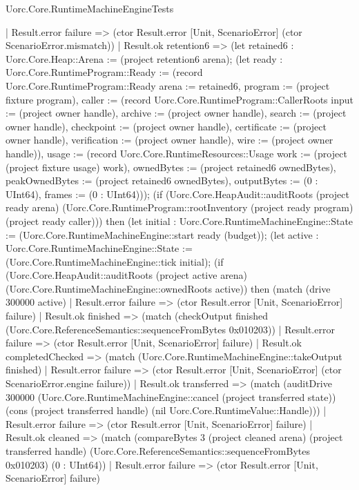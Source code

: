 \begin{lexlean}{Uorc.Core.RuntimeMachineEngineTests}
\begin{semanticmodule}
{                  | Result.error failure => (ctor Result.error [Unit, ScenarioError] (ctor ScenarioError.mismatch))
                  | Result.ok retention6 => (let retained6 : Uorc.Core.Heap::Arena := (project retention6 arena); (let ready : Uorc.Core.RuntimeProgram::Ready := (record Uorc.Core.RuntimeProgram::Ready {arena := retained6, program := (project fixture program), caller := (record Uorc.Core.RuntimeProgram::CallerRoots {input := (project owner handle), archive := (project owner handle), search := (project owner handle), checkpoint := (project owner handle), certificate := (project owner handle), verification := (project owner handle), wire := (project owner handle)}), usage := (record Uorc.Core.RuntimeResources::Usage {work := (project (project fixture usage) work), ownedBytes := (project retained6 ownedBytes), peakOwnedBytes := (project retained6 ownedBytes), outputBytes := (0 : UInt64), frames := (0 : UInt64)})}); (if (Uorc.Core.HeapAudit::auditRoots (project ready arena) (Uorc.Core.RuntimeProgram::rootInventory (project ready program) (project ready caller))) then (let initial : Uorc.Core.RuntimeMachineEngine::State := (Uorc.Core.RuntimeMachineEngine::start ready (budget)); (let active : Uorc.Core.RuntimeMachineEngine::State := (Uorc.Core.RuntimeMachineEngine::tick initial); (if (Uorc.Core.HeapAudit::auditRoots (project active arena) (Uorc.Core.RuntimeMachineEngine::ownedRoots active)) then (match (drive 300000 active)
                    | Result.error failure => (ctor Result.error [Unit, ScenarioError] failure)
                    | Result.ok finished => (match (checkOutput finished (Uorc.Core.ReferenceSemantics::sequenceFromBytes 0x010203))
                      | Result.error failure => (ctor Result.error [Unit, ScenarioError] failure)
                      | Result.ok completedChecked => (match (Uorc.Core.RuntimeMachineEngine::takeOutput finished)
                        | Result.error failure => (ctor Result.error [Unit, ScenarioError] (ctor ScenarioError.engine failure))
                        | Result.ok transferred => (match (auditDrive 300000 (Uorc.Core.RuntimeMachineEngine::cancel (project transferred state)) (cons (project transferred handle) (nil Uorc.Core.RuntimeValue::Handle)))
                          | Result.error failure => (ctor Result.error [Unit, ScenarioError] failure)
                          | Result.ok cleaned => (match (compareBytes 3 (project cleaned arena) (project transferred handle) (Uorc.Core.ReferenceSemantics::sequenceFromBytes 0x010203) (0 : UInt64))
                            | Result.error failure => (ctor Result.error [Unit, ScenarioError] failure)
}
\end{semanticmodule}
\end{lexlean}

